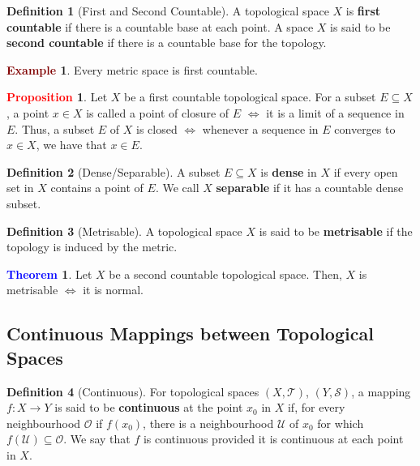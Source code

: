 \documentclass[11pt]{article}
\newcommand{\open}[0]{\mathcal{O}}
\newcommand{\topo}[0]{\mathcal{T}}
\newcommand{\hood}[0]{\mathcal{U}}
\theoremstyle{definition}
\theoremstyle{definition}
\newtheorem{theorem}{\textcolor{blue}{Theorem}}
\theoremstyle{definition}
\newtheorem{definition}{\textcolor{OliveGreen}{Definition}}
\newtheorem{prop}{\textcolor{red}{Proposition}}
\newtheorem{ex}{\textcolor{Maroon}{Example}}
\theoremstyle{remark}
\begin{document}
\begin{definition}[First and Second Countable]
	A topological space $X$ is \textbf{first countable} if there is a countable base at each point. A space $X$ is said to be \textbf{second countable} if there is a countable base for the topology.
\end{definition}

\begin{ex}
Every metric space is first countable. 	
\end{ex}

\begin{prop}
	Let $X$ be a first countable topological space. For a subset $E \subseteq X$, a point $x \in X$ is called a point of closure of $E$ $\iff$ it is a limit of a sequence in $E$. Thus, a subset $E$ of $X$ is closed $\iff$ whenever a sequence in $E$ converges to $x \in X$, we have that $x \in E$. 
\end{prop}

\begin{definition}[Dense/Separable]
	A subset $E \subseteq X$ is \textbf{dense} in $X$ if every open set in $X$ contains a point of $E$. We call $X$ \textbf{separable} if it has a countable dense subset. 
\end{definition}

\begin{definition}[Metrisable]
	A topological space $X$ is said to be \textbf{metrisable} if the topology is induced by the metric. 
\end{definition}

\begin{theorem}
	Let $X$ be a second countable topological space. Then, $X$ is metrisable $\iff$ it is normal. 
\end{theorem}


\subsection{Continuous Mappings between Topological Spaces}
\begin{definition}[Continuous]
	For topological spaces $(X, \topo)$, $(Y, \mathcal{S})$, a mapping $f: X \rightarrow Y$ is said to be \textbf{continuous} at the point $x_0$ in $X$ if, for every neighbourhood $\open$ if $f(x_0)$, there is a neighbourhood $\hood$ of $x_0$ for which $f(\hood) \subseteq \open$. We say that $f$ is continuous provided it is continuous at each point in $X$.  
\end{definition}
\end{document}
